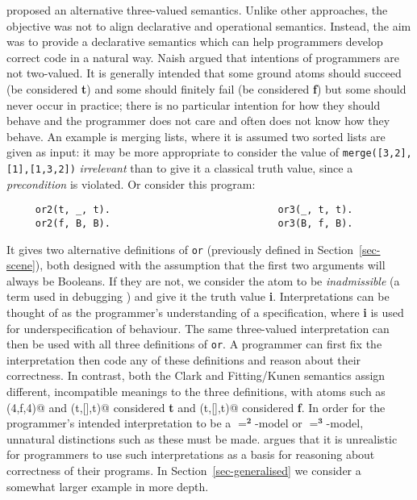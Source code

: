 \documentclass{tlp}
\newcommand{\Bi}{\ensuremath{\mathbf{2}}}
\newcommand{\Tri}{\ensuremath{\mathbf{3}}}
\begin{document}
 proposed an alternative three-valued semantics.
Unlike other approaches, the objective was not to align declarative and
operational semantics.  Instead, the aim was to provide a declarative
semantics which can help programmers develop correct code in a natural
way.  Naish argued that intentions of programmers are not two-valued.  It
is generally intended that some ground atoms should succeed (be considered
\textbf{t}) and some should finitely fail (be considered \textbf{f}) but
some should never occur in practice; there is no particular intention
for how they should behave and the programmer does not care and often
does not know how they behave. An example is merging lists, where it is
assumed two sorted lists are given as input: it may be more appropriate to
consider the value of \verb!merge([3,2],[1],[1,3,2])! \emph{irrelevant}
than to give it a classical truth value, since a \emph{precondition}
is violated.  Or consider this program:
\begin{verbatim}
     or2(t, _, t).                             or3(_, t, t).
     or2(f, B, B).                             or3(B, f, B).
\end{verbatim}
It gives two alternative definitions of \texttt{or} 
(previously defined in Section~\ref{sec-scene}), both designed with the 
assumption that the first two arguments will always be Booleans.
If they are not, we consider the atom to be \emph{inadmissible}
(a term used in debugging \cite{Per86,ddscheme3}) and give it
the truth value \textbf{i}.
Interpretations can be thought of as the programmer's understanding
of a specification, where \textbf{i} is used for underspecification
of behaviour.  The same three-valued interpretation can then be used with
all three definitions of \texttt{or}.  A programmer can first fix the
interpretation then code any of these definitions and reason about their
correctness.  In contrast, both the Clark and Fitting/Kunen semantics
assign different, incompatible
meanings to the three definitions, with atoms such
as (4,f,4)@ and (t,[],t)@ considered \textbf{t} and
(t,[],t)@ considered \textbf{f}.  In order for the programmer's
intended interpretation to be a $=^\Bi$-model or $=^\Tri$-model, unnatural
distinctions such as these must be made.   argues
that it is unrealistic for programmers to use such interpretations as 
a basis for reasoning about correctness of their programs.
In Section~\ref{sec-generalised} we consider a somewhat larger example
in more depth.
\end{document}
